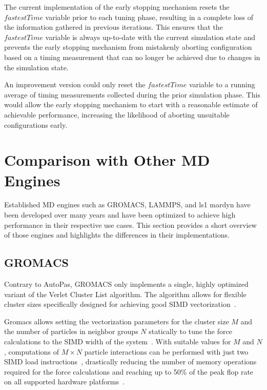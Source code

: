 \documentclass[conference]{IEEEtran}
\begin{document}
\begin{description}[leftmargin=1.2em, font=\itshape]
    \item[Limitations and Future Work:]
        The current implementation of the early stopping mechanism resets the $fastestTime$ variable prior to each tuning phase, resulting in a complete loss of the information gathered in previous iterations. This ensures that the $fastestTime$ variable is always up-to-date with the current simulation state and prevents the early stopping mechanism from mistakenly aborting configuration based on a timing measurement that can no longer be achieved due to changes in the simulation state.

        An improvement version could only reset the $fastestTime$ variable to a running average of timing measurements collected during the prior simulation phase. This would allow the early stopping mechanism to start with a reasonable estimate of achievable performance, increasing the likelihood of aborting unsuitable configurations early.

\end{description}

\section{Comparison with Other MD Engines}

Established MD engines such as GROMACS, LAMMPS, and ls1 mardyn have been developed over many years and have been optimized to achieve high performance in their respective use cases. This section provides a short overview of those engines and highlights the differences in their implementations.

\subsection{GROMACS}

Contrary to AutoPas, GROMACS only implements a single, highly optimized variant of the Verlet Cluster List algorithm. The algorithm allows for flexible cluster sizes specifically designed for achieving good SIMD vectorization~\cite{PALL20132641}.

Gromacs allows setting the vectorization parameters for the cluster size $M$ and the number of particles in neighbor groups $N$ statically to tune the force calculations to the SIMD width of the system~\cite{PALL20132641}. With suitable values for $M$ and $N$, computations of $M \times N$ particle interactions can be performed with just two SIMD load instructions~\cite{Solving_Software_Challenges_Exascale_2014}, drastically reducing the number of memory operations required for the force calculations and reaching up to 50\% of the peak flop rate on all supported hardware platforms~\cite{Solving_Software_Challenges_Exascale_2014}.
\end{document}
